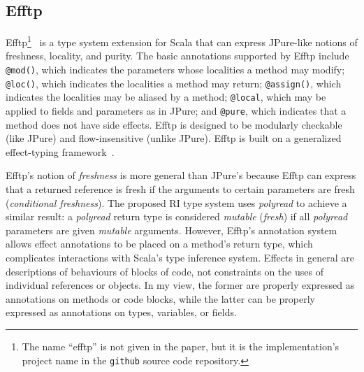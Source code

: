 \documentclass[letterpaper,11pt]{article}
\newcommand{\code}[1]{\lstinline$#1$}
\theoremstyle{definition}
\theoremstyle{remark}
\begin{document}
\begin{comment}
Surprisingly, I find that the guarantees offered by JPure's annotations
are nearly identical to ReIm's guarantees.
A \emph{fresh} reference in JPure is a \emph{mutable} reference in ReIm,
and conversely a \emph{stale} reference in JPure is a \emph{readonly} reference in ReIm.
\emph{Local} fields are \emph{polyread} fields, and \emph{local} parameters are \emph{mutable} parameters.
Assignment of a \emph{stale} reference to a \emph{local} field is not
permitted, nor can a \emph{stale} reference be returned from a \emph{fresh} method,
just as \emph{readonly} reference is not compatible with \emph{mutable}.
\end{comment}

\subsection{Efftp}

Efftp\footnote{The name ``efftp'' is not given in the paper, but it is the
implementation's project name in the \code{github} source code repository.}~\cite{efftp,rytz-thesis}
is a type system extension for Scala that can express JPure-like notions
of freshness, locality, and purity.
The basic annotations supported by Efftp include
\code{@mod()}, which indicates the parameters whose localities a method may modify;
\code{@loc()}, which indicates the localities a method may return;
\code{@assign()}, which indicates the localities may be aliased by a method;
\code{@local}, which may be applied to fields and parameters as in JPure;
and \code{@pure}, which indicates that a method does not have side effects.
Efftp is designed to be modularly checkable (like JPure) and flow-insensitive (unlike JPure).
Efftp is built on a generalized effect-typing framework~\cite{lightweight-polymorphic-effects,rytz-thesis}.

Efftp's notion of \emph{freshness} is more general than JPure's because
Efftp can express that a returned reference is fresh if the arguments to
certain parameters are fresh (\emph{conditional freshness}).
The proposed RI type system uses \emph{polyread} to achieve a similar result:
a \emph{polyread} return type is considered \emph{mutable} (\emph{fresh}) if all \emph{polyread} parameters
are given \emph{mutable} arguments.
However, Efftp's annotation system allows effect annotations to be placed
on a method's return type, which complicates interactions with Scala's
type inference system.
Effects in general are descriptions of behaviours of blocks of code,
not constraints on the uses of individual references or objects.
In my view, the former are properly expressed as annotations on methods or code blocks,
while the latter can be properly expressed as annotations on types, variables, or fields.
\end{document}
